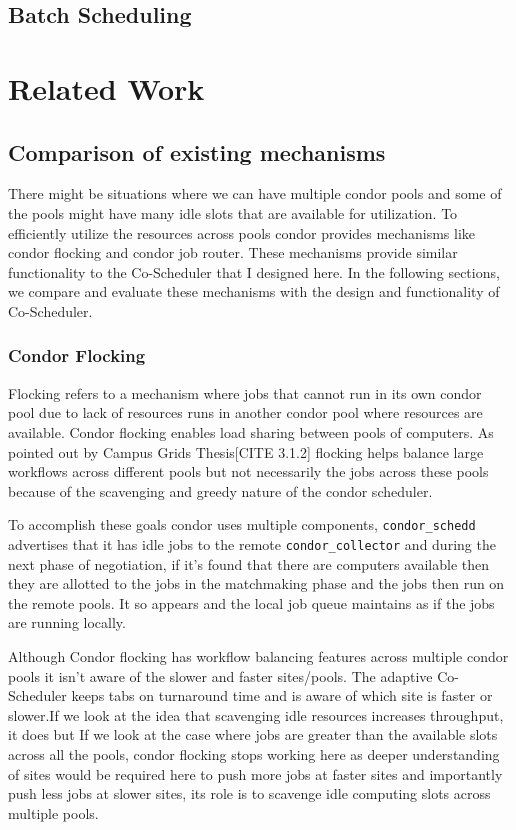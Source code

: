 \documentclass[ms,electronic,double]{nuthesis}
\begin{document}
\section{Batch Scheduling}


\chapter{Related Work}

\section{Comparison of existing mechanisms}
There might be situations where we can have multiple condor pools and some of 
the pools might have many idle slots that are available for utilization. To efficiently utilize the resources across pools condor provides 
mechanisms like condor flocking and condor job router. These mechanisms 
provide similar functionality to the Co-Scheduler that I designed here. In the following sections, we compare 
and evaluate these mechanisms with the design and functionality of Co-Scheduler.

\subsection{Condor Flocking}
Flocking refers to a mechanism where jobs that cannot run in its own condor pool 
due to lack of resources runs in another condor pool where resources are 
available. Condor flocking enables load sharing between pools of computers. As 
pointed out by Campus Grids Thesis[CITE 3.1.2]  flocking helps balance large workflows across different pools but not 
necessarily the jobs across these pools because of the scavenging and greedy nature 
of the condor scheduler.

To accomplish these goals condor uses multiple components, 
\texttt{condor\_schedd} advertises that it has idle jobs to the remote \texttt{condor\_collector} 
and during the next phase of negotiation, if it's found that there are computers 
available then they are allotted to the jobs in the matchmaking phase and the 
jobs then run on the remote pools. It so appears and the local job queue maintains as if 
the jobs are running locally. 

Although Condor flocking has workflow balancing features across multiple condor 
pools it isn't aware of the slower and faster sites/pools. The adaptive Co-Scheduler 
keeps tabs on turnaround time and is aware of which site is faster or slower.If we 
look at the idea that scavenging idle resources increases throughput, it does 
but If we look at the case where jobs are greater than the available slots 
across all the pools, condor flocking stops working here as deeper understanding of sites
would be required here to push more jobs at faster sites and importantly push less jobs
at slower sites, its role is to scavenge idle computing slots across multiple pools. 
\end{document}
